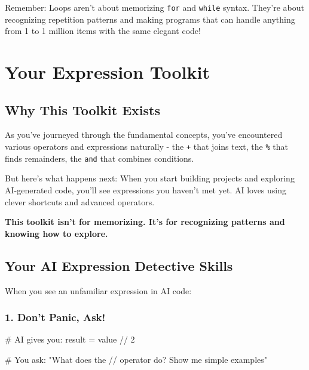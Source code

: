 \documentclass[
  letterpaper,
  DIV=11,
  numbers=noendperiod,
  oneside]{scrreprt}
\newenvironment{Shaded}{}{}
\newcommand{\CommentTok}[1]{\textcolor[rgb]{0.42,0.45,0.49}{#1}}
\newcommand{\DecValTok}[1]{\textcolor[rgb]{0.00,0.36,0.77}{#1}}
\newcommand{\NormalTok}[1]{\textcolor[rgb]{0.14,0.16,0.18}{#1}}
\newcommand{\OperatorTok}[1]{\textcolor[rgb]{0.14,0.16,0.18}{#1}}
\begin{document}
Remember: Loops aren't about memorizing \texttt{for} and \texttt{while}
syntax. They're about recognizing repetition patterns and making
programs that can handle anything from 1 to 1 million items with the
same elegant code!

\chapter{Your Expression Toolkit}\label{sec-expression-toolkit}

\section{Why This Toolkit Exists}\label{why-this-toolkit-exists}

As you've journeyed through the fundamental concepts, you've encountered
various operators and expressions naturally - the \texttt{+} that joins
text, the \texttt{\%} that finds remainders, the \texttt{and} that
combines conditions.

But here's what happens next: When you start building projects and
exploring AI-generated code, you'll see expressions you haven't met yet.
AI loves using clever shortcuts and advanced operators.

\textbf{This toolkit isn't for memorizing. It's for recognizing patterns
and knowing how to explore.}

\section{Your AI Expression Detective
Skills}\label{your-ai-expression-detective-skills}

When you see an unfamiliar expression in AI code:

\subsection{1. Don't Panic, Ask!}\label{dont-panic-ask}

\begin{Shaded}
\begin{Highlighting}[]
\CommentTok{\# AI gives you: }
\NormalTok{result }\OperatorTok{=}\NormalTok{ value }\OperatorTok{//} \DecValTok{2}

\CommentTok{\# You ask:}
\CommentTok{"What does the // operator do? Show me simple examples"}
\end{Highlighting}
\end{Shaded}
\end{document}
